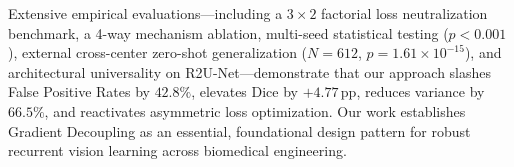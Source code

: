 Extensive empirical evaluations---including a $3 \times 2$ factorial loss
neutralization benchmark, a 4-way mechanism ablation, multi-seed statistical testing
($p < 0.001$), external cross-center zero-shot generalization ($N = 612$,
$p = 1.61 \times 10^{-15}$), and architectural universality on R2U-Net---demonstrate
that our approach slashes False Positive Rates by $42.8\%$, elevates Dice by $+4.77$\,pp,
reduces variance by $66.5\%$, and reactivates asymmetric loss optimization.
Our work establishes Gradient Decoupling as an essential, foundational design
pattern for robust recurrent vision learning across biomedical engineering.

